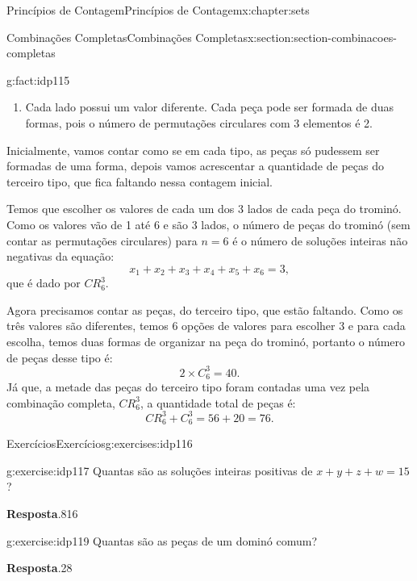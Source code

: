 \documentclass[oneside,10pt,]{book}
\newcommand{\blocktitlefont}{\relax}
\numberwithin{equation}{section}
\begin{document}
\begin{chapterptx}{Princípios de Contagem}{}{Princípios de Contagem}{}{}{x:chapter:sets}
\begin{sectionptx}{Combinações Completas}{}{Combinações Completas}{}{}{x:section:section-combinacoes-completas}
\begin{fact}{}{}{g:fact:idp115}
\begin{enumerate}
\item{}Cada lado possui um valor diferente. Cada peça pode ser formada de duas formas, pois o número de permutações circulares com 3 elementos é 2.%
\end{enumerate}
Inicialmente, vamos contar como se em cada tipo, as peças só pudessem ser formadas de uma forma, depois vamos acrescentar a quantidade de peças do terceiro tipo, que fica faltando nessa contagem inicial.%
\par
Temos que escolher os valores de cada um dos 3 lados de cada peça do trominó. Como os valores vão de 1 até 6 e são 3 lados, o número de peças do trominó (sem contar as permutações circulares) para \(n=6\) é o número de soluções inteiras não negativas da equação:%
\begin{equation*}
x_1 + x_2 + x_3 + x_4 + x_ 5 + x_ 6 = 3, 
\end{equation*}
que é dado por \(CR_6^3\).%
\par
Agora precisamos contar as peças, do terceiro tipo, que estão faltando. Como os três valores são diferentes, temos 6 opções de valores para escolher 3 e para cada escolha, temos duas formas de organizar na peça do trominó, portanto o número de peças desse tipo é:%
\begin{equation*}
2\times C_6^3 =40. 
\end{equation*}
Já que, a metade das peças do terceiro tipo foram contadas uma vez pela combinação completa, \(CR_6^3\), a quantidade total de peças é:%
\begin{equation*}
CR_6^{3} + C_6^3 = 56+20 = 76. 
\end{equation*}
%
\end{fact}
%
%
\typeout{************************************************}
\typeout{************************************************}
%
\begin{exercises-subsection}{Exercícios}{}{Exercícios}{}{}{g:exercises:idp116}
\begin{divisionexercise}{1}{}{}{g:exercise:idp117}%
Quantas são as soluções inteiras positivas de \(x+y+z+w = 15\)?%
\par\smallskip%
\noindent\textbf{\blocktitlefont Resposta}.\hypertarget{g:answer:idp118}{}\quad{}816%
\end{divisionexercise}%
\begin{divisionexercise}{2}{}{}{g:exercise:idp119}%
Quantas são as peças de um dominó comum?%
\par\smallskip%
\noindent\textbf{\blocktitlefont Resposta}.\hypertarget{g:answer:idp120}{}\quad{}28%

\end{divisionexercise}
\end{exercises-subsection}
\end{sectionptx}
\end{chapterptx}
\end{document}
